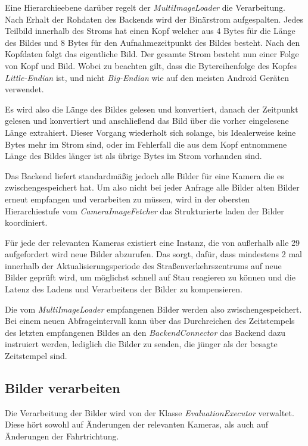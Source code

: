 Eine Hierarchieebene darüber regelt der {\em MultiImageLoader} die Verarbeitung.
Nach Erhalt der Rohdaten des Backends wird der Binärstrom aufgespalten.
Jedes Teilbild innerhalb des Stroms hat einen Kopf welcher aus 4 Bytes für die Länge des Bildes und 8 Bytes für den Aufnahmezeitpunkt des Bildes besteht.
Nach den Kopfdaten folgt das eigentliche Bild. Der gesamte Strom besteht nun einer Folge von Kopf und Bild. Wobei zu beachten gilt, dass die Bytereihenfolge des Kopfes {\em Little-Endian} ist, und nicht {\em Big-Endian} wie auf den meisten Android Geräten verwendet.

Es wird also die Länge des Bildes gelesen und konvertiert, danach der Zeitpunkt gelesen und konvertiert und anschließend das Bild über die vorher eingelesene Länge extrahiert. Dieser Vorgang wiederholt sich solange, bis Idealerweise keine Bytes mehr im Strom sind, oder im Fehlerfall die aus dem Kopf entnommene Länge des Bildes länger ist als übrige Bytes im Strom vorhanden sind.

Das Backend liefert standardmäßig jedoch alle Bilder für eine Kamera die es zwischengespeichert hat. Um also nicht bei jeder Anfrage alle Bilder alten Bilder erneut empfangen und verarbeiten zu müssen, wird in der obersten Hierarchiestufe vom {\em CameraImageFetcher} das Strukturierte laden der Bilder koordiniert.

Für jede der relevanten Kameras existiert eine Instanz, die von außerhalb alle 29 aufgefordert wird neue Bilder abzurufen. Das sorgt, dafür, dass mindestens 2 mal innerhalb der Aktualisierungsperiode des Straßenverkehrszentrums auf neue Bilder geprüft wird, um möglichst schnell auf Stau reagieren zu können und die Latenz des Ladens und Verarbeitens der Bilder zu kompensieren.

Die vom {\em MultiImageLoader} empfangenen Bilder werden also zwischengespeichert. Bei einem neuen Abfrageintervall kann über das Durchreichen des Zeitstempels des letzten empfangenen Bildes an den {\em BackendConnector} das Backend dazu instruiert werden, lediglich die Bilder zu senden, die jünger als der besagte Zeitstempel sind.

\subsection{Bilder verarbeiten}
Die Verarbeitung der Bilder wird von der Klasse {\em EvaluationExecutor} verwaltet.
Diese hört sowohl auf Änderungen der relevanten Kameras, als auch auf Änderungen der Fahrtrichtung.

